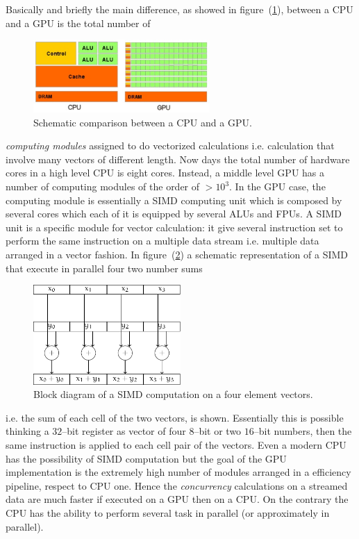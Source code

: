 Basically and briefly the main difference, as showed in figure~(\ref{fig:GPUvsCPU}), between a CPU and a GPU is the total number of 
\begin{figure}[h!t]
	\centering
	\includegraphics[width=0.6\textwidth]{./img/GPUvsCPU}
	\caption{Schematic comparison between a CPU and a GPU.}
	\label{fig:GPUvsCPU}
\end{figure}
\textit{computing modules} assigned to do vectorized calculations i.e. calculation that involve many vectors of different length. Now days the total number of hardware cores in a high level CPU is eight cores. Instead, a middle level GPU has a number of computing modules of the order of $ > 10^3$. In the GPU case, the computing module is essentially a \ac{SIMD} computing unit which is composed by several cores which each of it is equipped by several \acp{ALU} and \acp{FPU}. A \ac{SIMD} unit is a specific module for vector calculation: it give several instruction set to perform the same instruction on a multiple data stream i.e. multiple data arranged in a vector fashion. In figure~(\ref{fig:simd}) a schematic representation of a \ac{SIMD} that execute in parallel four two number sums
\begin{figure}[h!t]
	\centering
	\includegraphics[width=0.5\textwidth]{./img//simd/simd.pdf}
	\caption{Block diagram of a \acs{SIMD} computation on a four element vectors.}
	\label{fig:simd}
\end{figure}
i.e. the sum of each cell of the two vectors, is shown. Essentially this is possible thinking a $32$--bit register as vector of four $8$--bit or two $16$--bit numbers, then the same instruction is applied to each cell pair of the vectors. Even a modern CPU has the possibility of \ac{SIMD} computation but the goal of the GPU implementation is the extremely high number of modules arranged in a efficiency pipeline, respect to CPU one. Hence the \textit{concurrency} calculations on a streamed data are much faster if executed on a GPU then on a CPU. On the contrary the CPU has the ability to perform several task in parallel (or approximately in parallel).
